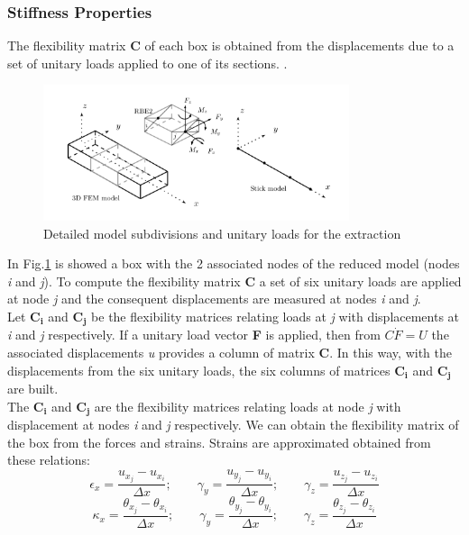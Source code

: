 \subsubsection{Stiffness Properties}
The flexibility matrix \textbf{C} of each box is obtained from the displacements due to a set of unitary loads applied to one of its sections. \cite{bru}.
\begin{figure}[H]
	\centering
	\includegraphics[width = 0.8\textwidth]{./Immagini/4_4.png}
	\caption{Detailed model subdivisions and unitary loads for the extraction}
	\label{fig:4_4}
\end{figure}
In Fig.\ref{fig:4_4} is showed a box with the 2 associated nodes of the reduced model (nodes \textit{i} and \textit{j}). To compute the flexibility matrix \textbf{C} a set of six unitary loads are applied at node \textit{j} and the consequent displacements are measured at nodes \textit{i} and \textit{j}. \\
Let $\mathbf{C_i}$ and $\mathbf{C_j}$ be the flexibility matrices relating loads at \textit{j} with displacements at \textit{i} and \textit{j} respectively. If a unitary load vector \textbf{F} is applied, then from $C\dot F = U$ the associated displacements \textit{u} provides a column of matrix \textbf{C}. In this way, with the displacements from the six unitary loads, the six columns of matrices $\mathbf{C_i}$ and $\mathbf{C_j}$ are built. \cite{bru}\\
The $\mathbf{C_i}$ and $\mathbf{C_j}$ are the flexibility matrices relating loads at node \textit{j} with displacement at nodes \textit{i} and \textit{j} respectively. We can obtain the flexibility matrix of the box from the forces and strains. Strains are approximated obtained from these relations:
\begin{equation*}
\epsilon_x=\frac{u_{x_j}-u_{x_i}}{\Delta x}; \qquad \gamma_y=\frac{u_{y_j}-u_{y_i}}{\Delta x}; \qquad \gamma_z=\frac{u_{z_j}-u_{z_i}}{\Delta x}
\end{equation*}
\begin{equation*}
\kappa_x=\frac{\theta_{x_j}-\theta_{x_i}}{\Delta x}; \qquad \gamma_y=\frac{\theta_{y_j}-\theta_{y_i}}{\Delta x}; \qquad \gamma_z=\frac{\theta_{z_j}-\theta_{z_i}}{\Delta x}
\end{equation*}
